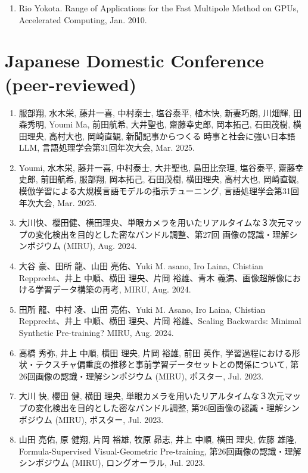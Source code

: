 \documentclass[margin,line]{cv}
\begin{document}
\begin{resume}
\begin{enumerate}
\item Rio Yokota. Range of Applications for the Fast Multipole Method on GPUs, Accelerated Computing, Jan. 2010.
\end{enumerate}

\section{\sc Japanese Domestic Conference (peer-reviewed)}
\begin{enumerate}
\item 服部翔, 水木栄, 藤井一喜, 中村泰士, 塩谷泰平, 植木快, 新妻巧朗, 川畑輝, 田森秀明, Youmi Ma, 前田航希, 大井聖也, 齋藤幸史郎, 岡本拓己, 石田茂樹, 横田理央, 高村大也, 岡崎直観, 新聞記事からつくる 時事と社会に強い日本語LLM, 言語処理学会第31回年次大会, Mar. 2025.

\item Youmi, 水木栄, 藤井一喜, 中村泰士, 大井聖也, 島田比奈理, 塩谷泰平, 齋藤幸史郎, 前田航希, 服部翔, 岡本拓己, 石田茂樹, 横田理央, 高村大也, 岡崎直観, 模倣学習による大規模言語モデルの指示チューニング, 言語処理学会第31回年次大会, Mar. 2025.

\item 大川快、櫻田健、横田理央、単眼カメラを用いたリアルタイムな３次元マップの変化検出を目的とした密なバンドル調整、第27回 画像の認識・理解シンポジウム (MIRU), Aug. 2024.

\item 大谷 豪、田所 龍、山田 亮佑、Yuki M. asano, Iro Laina, Chistian Repprecht、井上 中順、横田 理央、片岡 裕雄、青木 義満、画像超解像における学習データ構築の再考, MIRU, Aug. 2024.

\item 田所 龍、中村 凌、山田 亮佑、Yuki M. Asano, Iro Laina, Chistian Repprecht、井上 中順、横田 理央、片岡 裕雄、Scaling Backwards: Minimal Synthetic Pre-training? MIRU, Aug. 2024.

\item 高橋 秀弥, 井上 中順, 横田 理央, 片岡 裕雄, 前田 英作, 学習過程における形状・テクスチャ偏重度の推移と事前学習データセットとの関係について, 第26回画像の認識・理解シンポジウム (MIRU), ポスター, Jul. 2023.

\item 大川 快, 櫻田 健, 横田 理央, 単眼カメラを用いたリアルタイムな３次元マップの変化検出を目的とした密なバンドル調整, 第26回画像の認識・理解シンポジウム (MIRU), ポスター, Jul. 2023.

\item 山田 亮佑, 原 健翔, 片岡 裕雄, 牧原 昴志, 井上 中順, 横田 理央, 佐藤 雄隆, Formula-Supervised Visual-Geometric Pre-training, 第26回画像の認識・理解シンポジウム (MIRU), ロングオーラル, Jul. 2023.


\end{enumerate}
\end{resume}
\end{document}
